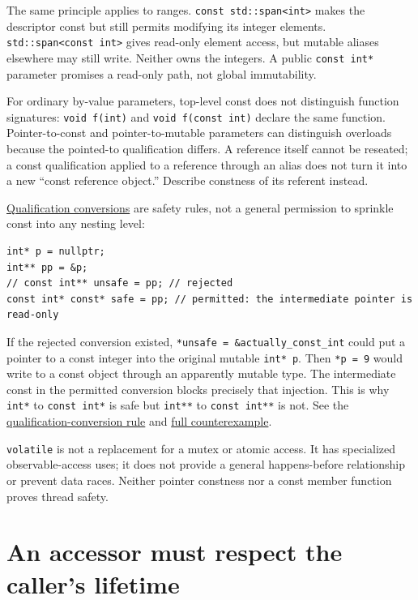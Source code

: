 The same principle applies to ranges. \texttt{const\ std::span\textless{}int\textgreater{}} makes the descriptor const but still permits modifying its integer elements. \texttt{std::span\textless{}const\ int\textgreater{}} gives read-only element access, but mutable aliases elsewhere may still write. Neither owns the integers. A public \texttt{const\ int*} parameter promises a read-only path, not global immutability.

For ordinary by-value parameters, top-level const does not distinguish function signatures: \texttt{void\ f(int)} and \texttt{void\ f(const\ int)} declare the same function. Pointer-to-const and pointer-to-mutable parameters can distinguish overloads because the pointed-to qualification differs. A reference itself cannot be reseated; a const qualification applied to a reference through an alias does not turn it into a new ``const reference object.'' Describe constness of its referent instead.

\hyperref[appendix-5e1a7561cd98]{Qualification conversions} are safety rules, not a general permission to sprinkle const into any nesting level:

\begin{verbatim}
int* p = nullptr;
int** pp = &p;
// const int** unsafe = pp; // rejected
const int* const* safe = pp; // permitted: the intermediate pointer is read-only
\end{verbatim}

If the rejected conversion existed, \texttt{*unsafe\ =\ \&actually\_const\_int} could put a pointer to a const integer into the original mutable \texttt{int*\ p}. Then \texttt{*p\ =\ 9} would write to a const object through an apparently mutable type. The intermediate const in the permitted conversion blocks precisely that injection. This is why \texttt{int*} to \texttt{const\ int*} is safe but \texttt{int**} to \texttt{const\ int**} is not. See the \href{https://eel.is/c++draft/conv.qual}{qualification-conversion rule} and \hyperref[01-foundations-i-ch011-c---qualification-safety-and-borrow-intervals]{full counterexample}.

\texttt{volatile} is not a replacement for a mutex or atomic access. It has specialized observable-access uses; it does not provide a general happens-before relationship or prevent data races. Neither pointer constness nor a const member function proves thread safety.

\section{An accessor must respect the caller's lifetime}\label{05-engine-i-ch003-an-accessor-must-respect-the-callers-lifetime}

